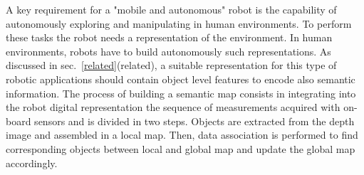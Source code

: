 \documentclass{article}
\begin{document}
%	
%	


A key requirement for a "mobile and autonomous" robot is the capability of autonomously exploring and manipulating in human environments. To perform these tasks the robot needs a representation of the environment. In human environments, robots have to build autonomously such representations. As discussed in sec.~\ref{related}(related), a suitable representation for this type of robotic applications should contain object level features to encode also semantic information. The process of building a semantic map consists in integrating into the robot digital representation the sequence of measurements acquired with on-board sensors and is divided in two steps. Objects are extracted from the depth image and assembled in a local map. Then, data association is performed to find corresponding objects between local and global map and update the global map accordingly.
	
\end{document}
